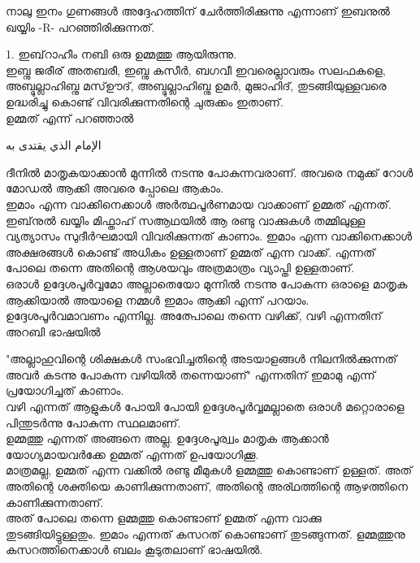   
  \textarabic{\quranayah[16][120]}
    \textarabic{\quranayah[16][121]}
 
 നാലു ഇനം ഗുണങ്ങൾ അദ്ദേഹത്തിന് ചേർത്തിരിക്കുന്നു എന്നാണ് ഇബനുൽ ഖയ്യിം -R-   പറഞ്ഞിരിക്കുന്നത്.  
 
 1. ഇബ്‌റാഹീം നബി ഒരു ഉമ്മത്തു ആയിരുന്നു. \\ 
 ഇബ്നു ജരീര് അതബരീ, ഇബ്നു കസീർ, ബഗവീ ഇവരെല്ലാവരും സലഫകളെ, അബ്ദുല്ലാഹിബ്നു മസ്ഊദ്,  അബ്ദുല്ലാഹിബ്നു ഉമർ, മുജാഹിദ്, തുടങ്ങിയുള്ളവരെ ഉദ്ധരിച്ചു കൊണ്ട് വിവരിക്കുന്നതിന്റെ ചുരുക്കം ഇതാണ്. \\
  ഉമ്മത് എന്ന് പറഞ്ഞാൽ
   
 \textarabic{الإمام الذي يقتدى به} 
  
 ദീനിൽ മാതൃകയാക്കാൻ മുന്നിൽ നടന്നു പോകുന്നവരാണ്.  അവരെ നമുക്ക് റോൾ മോഡൽ ആക്കി അവരെ പ്പോലെ ആകാം. \\
 
 ഇമാം എന്ന വാക്കിനെക്കാൾ അർത്ഥപൂർണമായ വാക്കാണ് ഉമ്മത് എന്നത്. ഇബ്‌നുൽ ഖയ്യിം മിഫ്താഹ് സആഥയിൽ ആ രണ്ടു വാക്കുകൾ തമ്മിലുള്ള വ്യത്യാസം സുദീർഘമായി വിവരിക്കുന്നത് കാണാം.   ഇമാം എന്ന വാക്കിനെക്കാൾ  അക്ഷരങ്ങൾ കൊണ്ട് അധികം ഉള്ളതാണ് ഉമ്മത് എന്ന വാക്ക്.  എന്നത് പോലെ തന്നെ അതിന്റെ ആശയവും അത്രമാത്രം വ്യാപ്തി ഉള്ളതാണ്. \\
 
 ഒരാൾ ഉദ്ദേശപൂർവ്വമോ അല്ലാതെയോ മുന്നിൽ നടന്നു പോകുന്ന ഒരാളെ മാതൃക ആക്കിയാൽ അയാളെ നമ്മൾ ഇമാം ആക്കി എന്ന് പറയാം. ഉദ്ദേശപൂർവമാവണം എന്നില്ല. അത്പോലെ തന്നെ വഴിക്ക്, വഴി എന്നതിന് അറബി ഭാഷയിൽ  
 
  \textarabic{ \quranayah[15][79]}
        
  "അല്ലാഹുവിന്റെ ശിക്ഷകൾ സംഭവിച്ചതിന്റെ അടയാളങ്ങൾ നിലനിൽക്കുന്നത് അവർ കടന്നു പോകുന്ന വഴിയിൽ തന്നെയാണ്" എന്നതിന് ഇമാമു എന്ന് പ്രയോഗിച്ചത് കാണാം. \\ 
  
  വഴി എന്നത് ആളുകൾ പോയി പോയി ഉദ്ദേശപൂർവ്വമല്ലാതെ ഒരാൾ മറ്റൊരാളെ പിന്തുടർന്നു പോകുന്ന സ്ഥലമാണ്. \\ 
  ഉമ്മത്തു എന്നത് അങ്ങനെ അല്ല. ഉദ്ദേശപൂര്വ്വം മാതൃക ആക്കാൻ യോഗ്യമായവർക്കേ ഉമ്മത് എന്നത് ഉപയോഗിക്കൂ. \\
  
   മാത്രമല്ല, ഉമ്മത് എന്ന വക്കിൽ രണ്ടു മീമുകൾ ളമ്മത്തു കൊണ്ടാണ് ഉള്ളത്. അത് അതിന്റെ ശക്തിയെ കാണിക്കുന്നതാണ്, അതിന്റെ അര്ഥത്തിന്റെ ആഴത്തിനെ കാണിക്കുന്നതാണ്. \\ 
   
   അത് പോലെ  തന്നെ ളമ്മത്തു കൊണ്ടാണ് ഉമ്മത് എന്ന വാക്കു തുടങ്ങിയിട്ടുള്ളതും. ഇമാം എന്നത് കസറത്‌ കൊണ്ടാണ് തുടങ്ങുന്നത്. ളമ്മത്തുനു കസറത്തിനെക്കാൾ ബലം കൂടുതലാണ് ഭാഷയിൽ. \\
   
